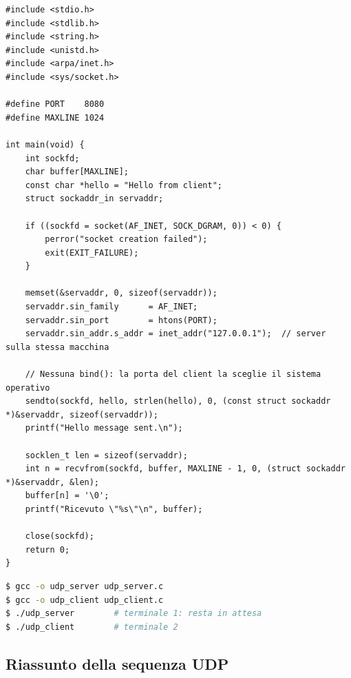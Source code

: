 \begin{lstlisting}[language={[POSIX]C}, style=wnumbers, title={udp\_client.c}]
#include <stdio.h>
#include <stdlib.h>
#include <string.h>
#include <unistd.h>
#include <arpa/inet.h>
#include <sys/socket.h>

#define PORT    8080
#define MAXLINE 1024

int main(void) {
    int sockfd;
    char buffer[MAXLINE];
    const char *hello = "Hello from client";
    struct sockaddr_in servaddr;

    if ((sockfd = socket(AF_INET, SOCK_DGRAM, 0)) < 0) {
        perror("socket creation failed");
        exit(EXIT_FAILURE);
    }

    memset(&servaddr, 0, sizeof(servaddr));
    servaddr.sin_family      = AF_INET;
    servaddr.sin_port        = htons(PORT);
    servaddr.sin_addr.s_addr = inet_addr("127.0.0.1");  // server sulla stessa macchina

    // Nessuna bind(): la porta del client la sceglie il sistema operativo
    sendto(sockfd, hello, strlen(hello), 0, (const struct sockaddr *)&servaddr, sizeof(servaddr));
    printf("Hello message sent.\n");

    socklen_t len = sizeof(servaddr);
    int n = recvfrom(sockfd, buffer, MAXLINE - 1, 0, (struct sockaddr *)&servaddr, &len);
    buffer[n] = '\0';
    printf("Ricevuto \"%s\"\n", buffer);

    close(sockfd);
    return 0;
}
\end{lstlisting}

\begin{lstlisting}[language=bash, title={Compilazione ed esecuzione, in due terminali}]
$ gcc -o udp_server udp_server.c
$ gcc -o udp_client udp_client.c
$ ./udp_server        # terminale 1: resta in attesa
$ ./udp_client        # terminale 2
\end{lstlisting}


\subsection{Riassunto della sequenza UDP}

